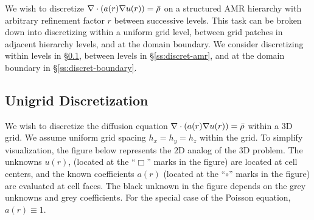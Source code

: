 \documentclass[10pt]{article}
\begin{document}
 \newcommand{\uzp}{u(\indvar+h_z)}
 \newcommand{\uzm}{u(\indvar-h_z)}
 \newcommand{\uzph}{u(\indvar+\frac{h_z}{2})}
 \newcommand{\uzmh}{u(\indvar-\frac{h_z}{2})}

 \newcommand{\ac}{a(\indvar)}
 \newcommand{\axph}{a(\indvar+\frac{h_x}{2})}
 \newcommand{\axmh}{a(\indvar-\frac{h_x}{2})}
 \newcommand{\ayph}{a(\indvar+\frac{h_y}{2})}
 \newcommand{\aymh}{a(\indvar-\frac{h_y}{2})}
 \newcommand{\azph}{a(\indvar+\frac{h_z}{2})}
 \newcommand{\azmh}{a(\indvar-\frac{h_z}{2})}

 \newcommand{\alc}{\alpha_{0}}
 \newcommand{\alxp}{\alpha_{x}}
 \newcommand{\alxm}{\alpha_{\bar{x}}}
 \newcommand{\alyp}{\alpha_{y}}
 \newcommand{\alym}{\alpha_{\bar{y}}}
 \newcommand{\alzp}{\alpha_{z}}
 \newcommand{\alzm}{\alpha_{\bar{z}}}

 \newcommand{\Uc}{U_{0}}
 \newcommand{\Uxp}{U_{x}}
 \newcommand{\Uxm}{U_{\bar{x}}}
 \newcommand{\Uyp}{U_{y}}
 \newcommand{\Uym}{U_{\bar{y}}}
 \newcommand{\Uzp}{U_{z}}
 \newcommand{\Uzm}{U_{\bar{z}}}

We wish to discretize $\nabla\cdot(\ac \nabla \uc) = \bar{\rho}$
on a structured AMR hierarchy with arbitrary refinement factor $r$
between successive levels.  This task can be broken down into
discretizing within a uniform grid level, between grid patches in
adjacent hierarchy levels, and at the domain boundary.  
We consider discretizing within levels in
\S\ref{ss:discret-unigrid}, between
levels in \S\ref{ss:discret-amr}, and at the domain boundary in
\S\ref{ss:discret-boundary}.

\subsection{Unigrid Discretization} \label{ss:discret-unigrid}

We wish to discretize the diffusion equation $\nabla\cdot(\ac \nabla
\uc) = \bar{\rho}$ within a $3$D grid.  We assume uniform
grid spacing $h_{x} = h_{y} = h_{z}$ within the grid.  To simplify
visualization, the figure below represents the $2$D analog of the $3$D
problem.  The unknowns $u(r)$, (located at the ``$\Box$'' marks in the
figure) are located at cell centers, and the known coefficients $a(r)$
(located at the ``$\circ$'' marks in the figure) are evaluated at cell
faces.  The black unknown in the figure depends on the grey unknowns
and grey coefficients.  For the special case of the Poisson equation,
$a(r)\equiv 1$.
\end{document}
